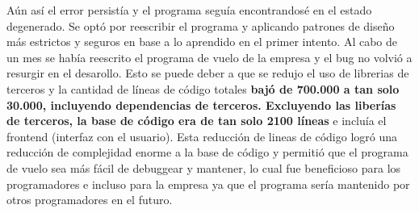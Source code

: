 Aún así el error persistía y el programa seguía encontrandosé en el estado degenerado. Se optó por reescribir el programa y aplicando patrones de diseño más estrictos y seguros en base a lo aprendido en el primer intento. Al cabo de un mes se había reescrito el programa de vuelo de la empresa y el bug no volvió a resurgir en el desarollo. Esto se puede deber a que se redujo el uso de librerias de terceros y la cantidad de líneas de código totales \textbf{bajó de 700.000 a tan solo 30.000, incluyendo dependencias de terceros. Excluyendo las liberías de terceros, la base de código era de tan solo 2100 líneas} e incluía el frontend (interfaz con el usuario). Esta reducción de lineas de código logró una reducción de complejidad enorme a la base de código y permitió que el programa de vuelo sea más fácil de debuggear y mantener, lo cual fue beneficioso para los programadores e incluso para la empresa ya que el programa sería mantenido por otros programadores en el futuro.

